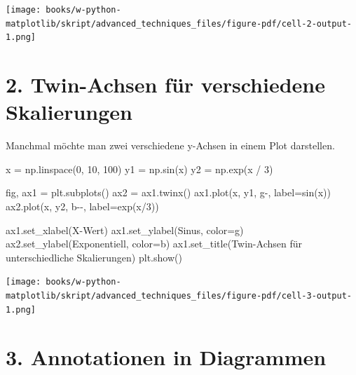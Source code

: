 \documentclass[
  letterpaper,
  DIV=11,
  numbers=noendperiod]{scrreprt}
\newenvironment{Shaded}{\begin{snugshade}}{\end{snugshade}}
\newcommand{\DecValTok}[1]{\textcolor[rgb]{0.68,0.00,0.00}{#1}}
\newcommand{\NormalTok}[1]{\textcolor[rgb]{0.00,0.23,0.31}{#1}}
\newcommand{\OperatorTok}[1]{\textcolor[rgb]{0.37,0.37,0.37}{#1}}
\newcommand{\StringTok}[1]{\textcolor[rgb]{0.13,0.47,0.30}{#1}}
\begin{document}
\texttt{[image: books/w-python-matplotlib/skript/advanced\_techniques\_files/figure-pdf/cell-2-output-1.png]}

\section{2. Twin-Achsen für verschiedene
Skalierungen}\label{twin-achsen-fuxfcr-verschiedene-skalierungen}

Manchmal möchte man zwei verschiedene y-Achsen in einem Plot darstellen.

\begin{Shaded}
\begin{Highlighting}[]
\NormalTok{x }\OperatorTok{=}\NormalTok{ np.linspace(}\DecValTok{0}\NormalTok{, }\DecValTok{10}\NormalTok{, }\DecValTok{100}\NormalTok{)}
\NormalTok{y1 }\OperatorTok{=}\NormalTok{ np.sin(x)}
\NormalTok{y2 }\OperatorTok{=}\NormalTok{ np.exp(x }\OperatorTok{/} \DecValTok{3}\NormalTok{)}

\NormalTok{fig, ax1 }\OperatorTok{=}\NormalTok{ plt.subplots()}
\NormalTok{ax2 }\OperatorTok{=}\NormalTok{ ax1.twinx()}
\NormalTok{ax1.plot(x, y1, }\StringTok{\textquotesingle{}g{-}\textquotesingle{}}\NormalTok{, label}\OperatorTok{=}\StringTok{\textquotesingle{}sin(x)\textquotesingle{}}\NormalTok{)}
\NormalTok{ax2.plot(x, y2, }\StringTok{\textquotesingle{}b{-}{-}\textquotesingle{}}\NormalTok{, label}\OperatorTok{=}\StringTok{\textquotesingle{}exp(x/3)\textquotesingle{}}\NormalTok{)}

\NormalTok{ax1.set\_xlabel(}\StringTok{\textquotesingle{}X{-}Wert\textquotesingle{}}\NormalTok{)}
\NormalTok{ax1.set\_ylabel(}\StringTok{\textquotesingle{}Sinus\textquotesingle{}}\NormalTok{, color}\OperatorTok{=}\StringTok{\textquotesingle{}g\textquotesingle{}}\NormalTok{)}
\NormalTok{ax2.set\_ylabel(}\StringTok{\textquotesingle{}Exponentiell\textquotesingle{}}\NormalTok{, color}\OperatorTok{=}\StringTok{\textquotesingle{}b\textquotesingle{}}\NormalTok{)}
\NormalTok{ax1.set\_title(}\StringTok{\textquotesingle{}Twin{-}Achsen für unterschiedliche Skalierungen\textquotesingle{}}\NormalTok{)}
\NormalTok{plt.show()}
\end{Highlighting}
\end{Shaded}

\texttt{[image: books/w-python-matplotlib/skript/advanced\_techniques\_files/figure-pdf/cell-3-output-1.png]}

\section{3. Annotationen in
Diagrammen}\label{annotationen-in-diagrammen}
\end{document}
